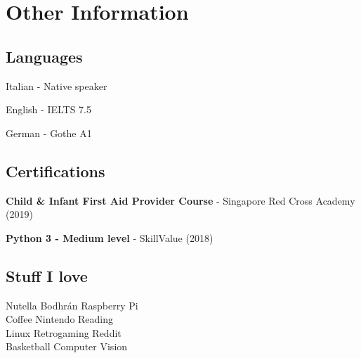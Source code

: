 \documentclass[a4paper]{deedy-resume} %
\begin{document}
\begin{minipage}[t]{0.28\textwidth} %

\section{Other Information}
\subsection{Languages}
\vspace{\topsep} %
\begin{tightitemize}
\item Italian - Native speaker
\item English - IELTS 7.5
\item German - Gothe A1
\end{tightitemize}
\sectionspace
\sectionspace
\subsection{Certifications}
\vspace{\topsep} %
\begin{tightitemize}
\item\textbf{Child \& Infant First Aid Provider Course} - Singapore Red Cross Academy (2019)
\item\textbf{Python 3 - Medium level} - SkillValue (2018)
\end{tightitemize}
\sectionspace
\sectionspace
\subsection{Stuff I love}
Nutella \textbullet{} Bodhrán \textbullet{} Raspberry Pi  \\Coffee \textbullet{} Nintendo \textbullet{} Reading \\	Linux \textbullet{} Retrogaming \textbullet{} Reddit \\ Basketball \textbullet{} Computer Vision  \\
\sectionspace %

\iffalse

\end{minipage}
\end{document}
